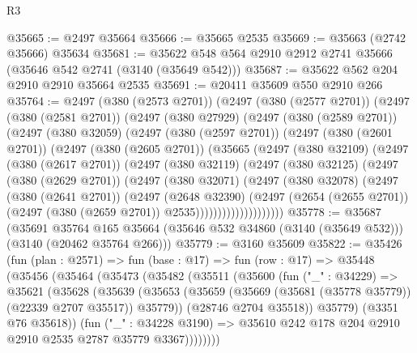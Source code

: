 \begin{lexlean}{R3}
\begin{coremodule}
@35665 := @2497 @35664
@35666 := @35665 @2535
@35669 := @35663 (@2742 @35666) @35634
@35681 := @35622 @548 @564 @2910 @2912 @2741 @35666 (@35646 @542 @2741 (@3140 (@35649 @542)))
@35687 := @35622 @562 @204 @2910 @2910 @35664 @2535
@35691 := @20411 @35609 @550 @2910 @266
@35764 := @2497
    (@380 (@2573 @2701))
    (@2497
      (@380 (@2577 @2701))
      (@2497
        (@380 (@2581 @2701))
        (@2497
          (@380 @27929)
          (@2497
            (@380 (@2589 @2701))
            (@2497
              (@380 @32059)
              (@2497
                (@380 (@2597 @2701))
                (@2497
                  (@380 (@2601 @2701))
                  (@2497
                    (@380 (@2605 @2701))
                    (@35665
                      (@2497
                        (@380 @32109)
                        (@2497
                          (@380 (@2617 @2701))
                          (@2497
                            (@380 @32119)
                            (@2497
                              (@380 @32125)
                              (@2497
                                (@380 (@2629 @2701))
                                (@2497
                                  (@380 @32071)
                                  (@2497
                                    (@380 @32078)
                                    (@2497
                                      (@380 (@2641 @2701))
                                      (@2497
                                        (@2648 @32390)
                                        (@2497
                                          (@2654 (@2655 @2701))
                                          (@2497 (@380 (@2659 @2701)) @2535))))))))))))))))))))
@35778 := @35687
    (@35691
      @35764
      @165
      @35664
      (@35646 @532 @34860 (@3140 (@35649 @532)))
      (@3140 (@20462 @35764 @266)))
@35779 := @3160 @35609
@35822 := @35426
    (fun (plan : @2571) =>
    fun (base : @17) =>
    fun (row : @17) =>
    @35448
      (@35456
        (@35464
          (@35473
            (@35482
              (@35511
                (@35600
                  (fun ("_" : @34229) =>
                  @35621
                    (@35628
                      (@35639
                        (@35653
                          (@35659 (@35669 (@35681 (@35778 @35779)) (@22339 @2707 @35517)) @35779))
                        (@28746 @2704 @35518))
                      @35779)
                    (@3351 @76 @35618))
                  (fun ("_" : @34228 @3190) =>
                  @35610 @242 @178 @204 @2910 @2910 @2535 @2787 @35779 @3367))))))))

\end{coremodule}
\end{lexlean}
